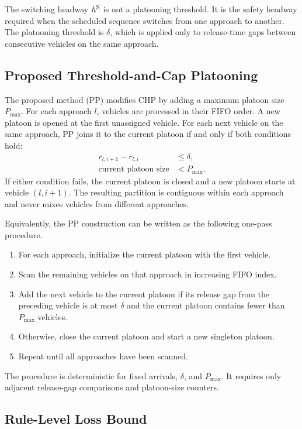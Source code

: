The switching headway \(h^{\mathrm{S}}\) is not a platooning threshold. It is the safety headway required when the scheduled sequence switches from one approach to another. The platooning threshold is \(\delta\), which is applied only to release-time gaps between consecutive vehicles on the same approach.

\subsection{Proposed Threshold-and-Cap Platooning}
\label{sec:pp-rule}

The proposed method (PP) modifies CHP by adding a maximum platoon size \(P_{\max}\). For each approach \(l\), vehicles are processed in their FIFO order. A new platoon is opened at the first unassigned vehicle. For each next vehicle on the same approach, PP joins it to the current platoon if and only if both conditions hold:
\begin{align}
r_{l,i+1}-r_{l,i} &\le \delta,\\
\text{current platoon size} &< P_{\max}.
\end{align}
If either condition fails, the current platoon is closed and a new platoon starts at vehicle \((l,i+1)\). The resulting partition is contiguous within each approach and never mixes vehicles from different approaches.

Equivalently, the PP construction can be written as the following one-pass procedure.
\begin{enumerate}[label=\arabic*.]
  \item For each approach, initialize the current platoon with the first vehicle.
  \item Scan the remaining vehicles on that approach in increasing FIFO index.
  \item Add the next vehicle to the current platoon if its release gap from the preceding vehicle is at most \(\delta\) and the current platoon contains fewer than \(P_{\max}\) vehicles.
  \item Otherwise, close the current platoon and start a new singleton platoon.
  \item Repeat until all approaches have been scanned.
\end{enumerate}
The procedure is deterministic for fixed arrivals, \(\delta\), and \(P_{\max}\). It requires only adjacent release-gap comparisons and platoon-size counters.

\subsection{Rule-Level Loss Bound}
\label{sec:rule-level-bound}

